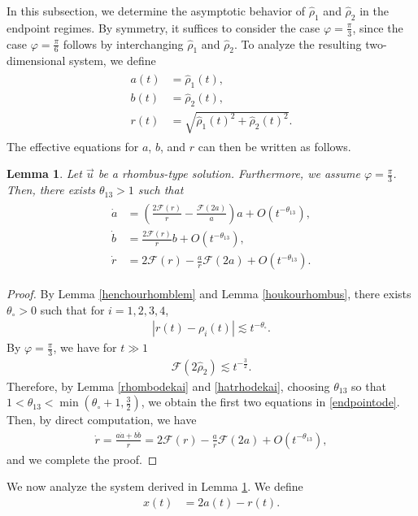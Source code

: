 \documentclass[reqno]{amsart}
\theoremstyle{plain}
\newtheorem{lemma}[theorem]{Lemma}
\theoremstyle{definition}
\numberwithin{equation}{section}
\begin{document}
In this subsection, we determine the asymptotic behavior of $\hat{\rho}_1$ and $\hat{\rho}_2$ in the endpoint regimes. By symmetry,
it suffices to consider the case $\varphi=\frac{\pi}{3}$, since the case $\varphi=\frac{\pi}{6}$ follows by interchanging $\hat{\rho}_1$ and $\hat{\rho}_2$. To analyze the resulting two-dimensional system, we define
\begin{align}\label{abrdef}
\begin{aligned}
a(t)&=\hat{\rho}_1(t),
\\
b(t)&=\hat{\rho}_2(t),
\\
r(t)&=\sqrt{\hat{\rho}_1(t)^2+\hat{\rho}_2(t)^2}.
\end{aligned}
\end{align}
The effective equations for $a$, $b$, and $r$ can then be written as follows.
\begin{lemma}\label{endpointlem1}
Let $\vec{u}$ be a rhombus-type solution. Furthermore, we assume $\varphi=\frac{\pi}{3}$. Then,  there exists $\theta_{13}>1$ such that
\begin{align}\label{endpointode}
\begin{aligned}
\dot{a}&=\left(\frac{2\mathcal{F}(r)}{r}-\frac{\mathcal{F}(2a)}{a}\right)a+O\left(t^{-\theta_{13}}\right),
\\
\dot{b}&=\frac{2\mathcal{F}(r)}{r}b+O\left(t^{-\theta_{13}}\right),
\\
\dot{r}&=2\mathcal{F}(r)-\frac{a}{r}\mathcal{F}(2a)+O\left(t^{-\theta_{13}}\right).
\end{aligned}
\end{align}
\end{lemma}
\begin{proof}
By Lemma \ref{henchourhomblem} and Lemma \ref{houkourhombus}, there exists $\theta_{\circ}>0$ such that for $i=1,2,3,4$,
\begin{align*}
\left|r(t)-\rho_i(t)\right|\lesssim t^{-\theta_{\circ}}.
\end{align*}
By $\varphi=\frac{\pi}{3}$, we have for $t\gg 1$
\begin{align}\label{hatrhodekai}
\mathcal{F}(2\hat{\rho}_2)\lesssim t^{-\frac{3}{2}}.
\end{align}
Therefore, by Lemma \ref{rhombodekai} and \eqref{hatrhodekai}, choosing $\theta_{13}$ so that $1<\theta_{13}<\min{(\theta_{\circ}+1,\frac{3}{2})}$, 
we obtain the first two equations in \eqref{endpointode}. Then, by direct computation, we have
\begin{align*}
\dot{r}=\frac{a\dot{a}+b\dot{b}}{r}=2\mathcal{F}(r)-\frac{a}{r}\mathcal{F}(2a)+O\left(t^{-\theta_{13}}\right),
\end{align*}
and we complete the proof.
\end{proof}
We now analyze the system derived in Lemma \ref{endpointlem1}. We define 
\begin{align*}
x(t)&=2a(t)-r(t).
\end{align*}
\end{document}
